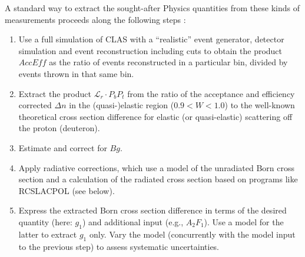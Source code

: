 A standard way to extract the sought-after Physics quantities from these kinds of measurements proceeds along the following steps \cite{KuhnEG4ana}:
\begin{enumerate}
\item Use a full simulation of CLAS with a ``realistic'' event generator, detector simulation and event reconstruction 
including cuts to obtain the product $Acc Eff$ as the ratio of events  reconstructed  in a particular bin, divided by events thrown in that same bin.
\item Extract the product ${\mathcal L}_r  \cdot P_b P_t$ from the ratio of the acceptance and efficiency corrected $\Delta n$ in the (quasi-)elastic region ($0.9 < W < 1.0$) to the well-known theoretical cross section difference for elastic (or quasi-elastic) scattering off the proton (deuteron).
\item Estimate and correct for $Bg$.
\item Apply radiative corrections, which use a model of the unradiated Born cross section and a calculation of the radiated cross section based on programs like RCSLACPOL (see below). %
\item Express the extracted Born cross section difference in terms of the desired quantity (here: $g_1$) and 
additional input (e.g., $A_2F_1$). Use a model for the latter to extract $g_1$ only. Vary the model (concurrently with
the model input to the previous step) to assess systematic uncertainties.
\end{enumerate}

